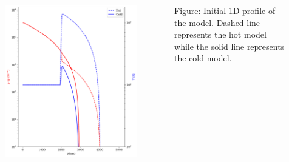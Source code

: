 \documentclass[
	11pt, %
]{beamer}
\begin{document}
\begin{frame}[allowframebreaks]
    \begin{columns}
            \begin{figure}
                \includegraphics[height=0.85\textheight]{initial_profile.pdf}
            \end{figure}
        
            \small Figure: Initial 1D profile of the model. Dashed line represents the hot model while the solid line represents the cold model.
    \end{columns}
\end{frame}
\end{document}
